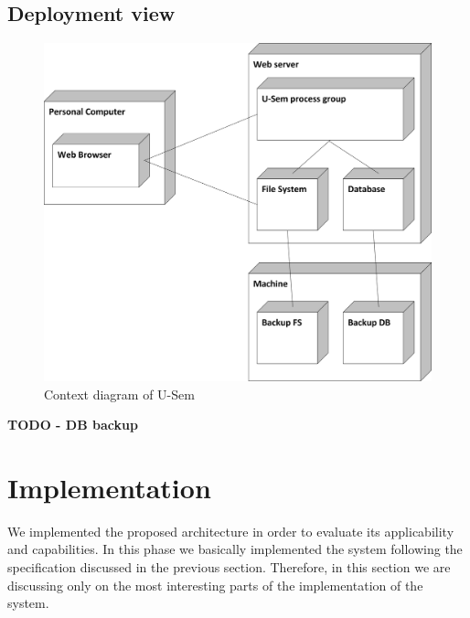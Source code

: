 \documentclass[a4paper, notitlepage]{article}
\begin{document}
\subsection{Deployment view}

\begin{figure}[h!]
  \centering
  	\includegraphics[scale=0.5]{functional/deployment.png}
  \caption{Context diagram of U-Sem }
  \label{fig_context}
\end{figure}

\textbf{TODO - DB backup}

\section{Implementation}
We implemented the proposed architecture in order to evaluate its applicability and capabilities. In this phase we basically implemented the system following the specification discussed in the previous section. Therefore, in this section we are discussing only on the most interesting parts of the implementation of the system.
\end{document}
